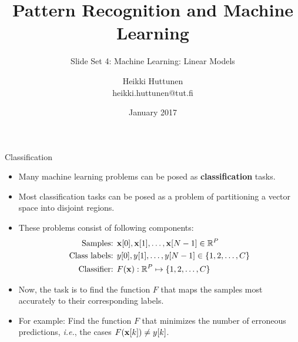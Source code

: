 \documentclass[10pt, aspectratio=169]{beamer} %
\title{Pattern Recognition and Machine Learning}
\subtitle{Slide Set 4: Machine Learning: Linear Models}
\author{Heikki Huttunen\\
heikki.huttunen@tut.fi}
\institute{Department of Signal Processing\\Tampere University of Technology}
\date{January 2017}
\newcommand{\R}{{\mathbb{R}}}
\newcommand{\x}{{\bf x}}
\begin{document}
\maketitle


\lstset{language=Python,style=mystyle} 


\begin{frame}{Classification}
\begin{itemize}
\item Many machine learning problems can be posed as \textbf{classification} tasks.
\item Most classification tasks can be posed as a problem of partitioning a vector space into disjoint regions.
\item These problems consist of following components:
\begin{align*}
\text{Samples: } & \x[0],\x[1],\ldots,\x[N-1] \in \R^P\\
\text{Class labels: } & y[0],y[1],\ldots,y[N-1] \in \{1,2,\ldots, C\}\\
\text{Classifier: } & F(\x): \R^P \mapsto \{1,2,\ldots, C\}
\end{align*}
\item Now, the task is to find the function $F$ that maps the samples most 
accurately to their corresponding labels.
\item For example: Find the function $F$ that minimizes the number 
of erroneous predictions, \emph{i.e.}, the cases  $F(\x[k]) \ne y[k]$.
\end{itemize}
\end{frame}
\end{document}

